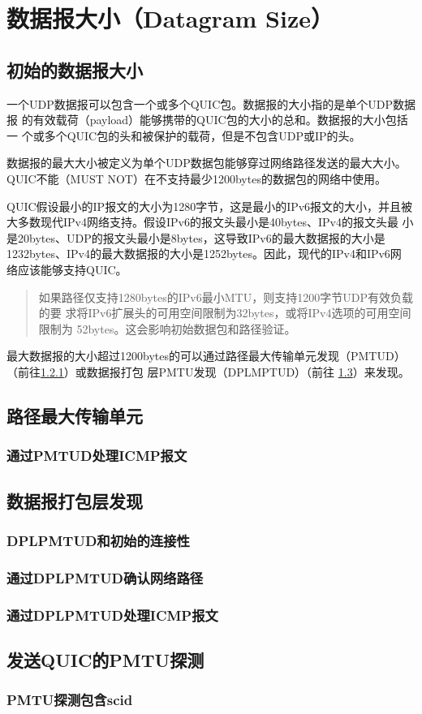 \section{数据报大小（Datagram Size）}
\subsection{初始的数据报大小}
\label{subsec:initial-datagram-size}
一个UDP数据报可以包含一个或多个QUIC包。数据报的大小指的是单个UDP数据报
的有效载荷（payload）能够携带的QUIC包的大小的总和。数据报的大小包括一
个或多个QUIC包的头和被保护的载荷，但是不包含UDP或IP的头。

数据报的最大大小被定义为单个UDP数据包能够穿过网络路径发送的最大大小。
QUIC不能（MUST NOT）在不支持最少1200bytes的数据包的网络中使用。

QUIC假设最小的IP报文的大小为1280字节，这是最小的IPv6报文的大小，并且被
大多数现代IPv4网络支持。假设IPv6的报文头最小是40bytes、IPv4的报文头最
小是20bytes、UDP的报文头最小是8bytes，这导致IPv6的最大数据报的大小是
1232bytes、IPv4的最大数据报的大小是1252bytes。因此，现代的IPv4和IPv6网
络应该能够支持QUIC。

\begin{quote}
  如果路径仅支持1280bytes的IPv6最小MTU，则支持1200字节UDP有效负载的要
  求将IPv6扩展头的可用空间限制为32bytes，或将IPv4选项的可用空间限制为
  52bytes。这会影响初始数据包和路径验证。
\end{quote}

最大数据报的大小超过1200bytes的可以通过路径最大传输单元发现（PMTUD）
（前往\ref{subsubsec:handling-of-icmp-messages-by-pmtud}）或数据报打包
层PMTU发现（DPLMPTUD）（前往
\ref{subsec:datagram-packetization-layer-pmtu-discovery}）来发现。

\subsection{路径最大传输单元}
\subsubsection{通过PMTUD处理ICMP报文}
\label{subsubsec:handling-of-icmp-messages-by-pmtud}

\subsection{数据报打包层发现}
\label{subsec:datagram-packetization-layer-pmtu-discovery}

\subsubsection{DPLPMTUD和初始的连接性}
\subsubsection{通过DPLPMTUD确认网络路径}
\subsubsection{通过DPLPMTUD处理ICMP报文}

\subsection{发送QUIC的PMTU探测}
\subsubsection{PMTU探测包含scid}